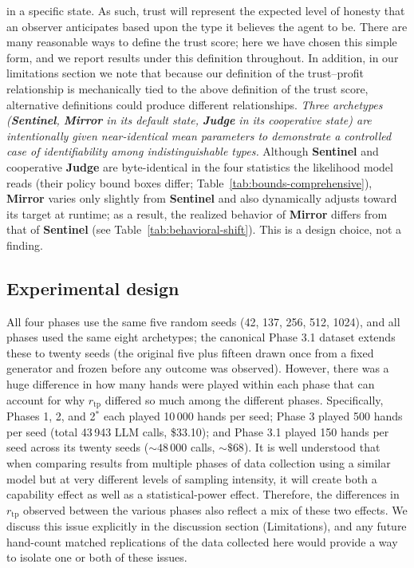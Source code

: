 \documentclass[10pt,twocolumn,letterpaper]{article}
\newcommand{\arch}[1]{\textbf{#1}}
\newcommand{\rtp}{\ensuremath{r_{\mathrm{tp}}}}
\begin{document}
in a specific state. As such, trust will represent the expected level
of honesty that an observer anticipates based upon the type it
believes the agent to be. There are many reasonable ways to define the trust score;
here we have chosen this simple form, and we report results under
this definition throughout. In addition, in our
limitations section we note that because our definition of the
trust--profit relationship is mechanically tied to the above
definition of the trust score, alternative definitions could
produce different relationships. \textit{Three archetypes
(\arch{Sentinel}, \arch{Mirror} in its default state, \arch{Judge}
in its cooperative state) are intentionally given near-identical mean
parameters to demonstrate a controlled case of identifiability among
indistinguishable types.} Although \arch{Sentinel} and cooperative \arch{Judge} are byte-identical
in the four statistics the likelihood model reads (their policy bound boxes
differ; Table~\ref{tab:bounds-comprehensive}), \arch{Mirror} varies only slightly from \arch{Sentinel} and also dynamically
adjusts toward its target at runtime; as a result, the realized
behavior of \arch{Mirror} differs from that of \arch{Sentinel}
(see Table~\ref{tab:behavioral-shift}).
This is a design choice, not a finding.

\subsection{Experimental design}
All four phases use the same five random seeds (42, 137, 256, 512, 1024), and all phases used the same eight archetypes; the canonical Phase 3.1 dataset extends these to twenty seeds (the original five plus fifteen drawn once from a fixed generator and frozen before any outcome was observed). However, there
was a huge difference in how many hands were played within each
phase that can account for why $\rtp$ differed so much among the
different phases. Specifically, Phases 1, 2, and 2$^{*}$ each played
10\,000 hands per seed; Phase 3 played 500 hands per seed (total
43\,943 LLM calls, \$33.10); and Phase 3.1 played 150 hands per seed across its twenty seeds (${\sim}48\,000$ calls, ${\sim}\$68$). It is well understood that when
comparing results from multiple phases of data collection using a
similar model but at very different levels of sampling intensity, it
will create both a capability effect as well as a statistical-power
effect. Therefore, the differences in $\rtp$ observed between the
various phases also reflect a mix of these two effects. We discuss
this issue explicitly in the discussion section (Limitations), and
any future hand-count matched replications of the data collected
here would provide a way to isolate one or both of these issues.
\end{document}
